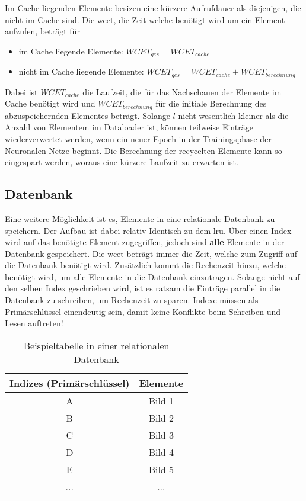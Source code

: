Im Cache liegenden Elemente besizen eine kürzere Aufrufdauer als diejenigen, die nicht im Cache sind. Die \ac{wcet}, die Zeit welche benötigt wird um ein Element aufzufen, beträgt für

\begin{itemize}
\item im Cache liegende Elemente: $WCET_{ges}=WCET_{cache}$
\item nicht im Cache liegende Elemente: $WCET_{ges}=WCET_{cache} + WCET_{berechnung}$
\end{itemize}

Dabei ist $WCET_{cache}$ die Laufzeit, die für das Nachschauen der Elemente im Cache benötigt wird und $WCET_{berechnung}$ für die initiale Berechnung des abzuspeichernden Elementes beträgt. Solange $l$ nicht wesentlich kleiner als die Anzahl von Elementem im Dataloader ist, können teilweise Einträge wiederverwertet werden, wenn ein neuer Epoch in der Trainingsphase der Neuronalen Netze beginnt. Die Berechnung der recycelten Elemente kann so eingespart werden, woraus eine kürzere Laufzeit zu erwarten ist.






\subsection{Datenbank}\label{database}
Eine weitere Möglichkeit ist es, Elemente in eine relationale Datenbank zu speichern. Der Aufbau ist dabei relativ Identisch zu dem \ac{lru}. Über einen Index wird auf das benötigte Element zugegriffen, jedoch sind \textbf{alle} Elemente in der Datenbank gespeichert. Die \ac{wcet} beträgt immer die Zeit, welche zum Zugriff auf die Datenbank benötigt wird. Zusätzlich kommt die Rechenzeit hinzu, welche benötigt wird, um alle Elemente in die Datenbank einzutragen. Solange nicht auf den selben Index geschrieben wird, ist es ratsam die Einträge parallel in die Datenbank zu schreiben, um Rechenzeit zu sparen. Indexe müssen als Primärschlüssel einendeutig sein, damit keine Konflikte beim Schreiben und Lesen auftreten!

\begin{table}[h]\vspace{1ex}\centering
  \begin{tabular*}{9cm}{c|c}
  \textbf{Indizes (Primärschlüssel)} & \textbf{Elemente}
  \\\hline
  A   &  Bild 1 \\
  B   &  Bild 2 \\
  C   &  Bild 3 \\
  D   &  Bild 4 \\
  E   &  Bild 5 \\
  ... & ...

  \\\hline
  \end{tabular*}
  \caption[Beispieltabelle in einer relationalen Datenbank]{Beispieltabelle in einer relationalen Datenbank}\label{cap:database}
\vspace{2ex}\end{table}\label{table:database}


